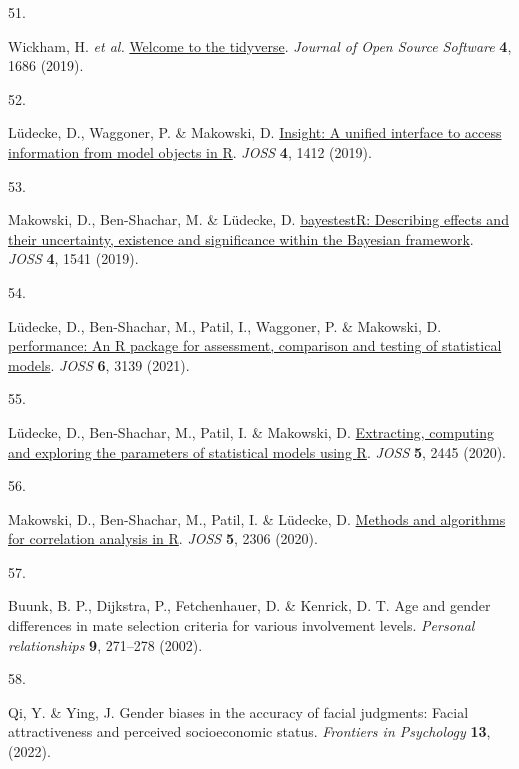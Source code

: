 \documentclass[
  man,floatsintext]{apa6}
\newlength{\cslhangindent}
\newlength{\csllabelwidth}
\newlength{\cslentryspacingunit} %
\newenvironment{CSLReferences}[2] %
 {%
  \setlength{\parindent}{0pt}
  \ifodd #1
  \let\oldpar\par
  \def\par{\hangindent=\cslhangindent\oldpar}
  \fi
  \setlength{\parskip}{#2\cslentryspacingunit}
 }%
 {}
\newcommand{\CSLLeftMargin}[1]{\parbox[t]{\csllabelwidth}{#1}}
\newcommand{\CSLRightInline}[1]{\parbox[t]{\linewidth - \csllabelwidth}{#1}\break}
\begin{document}
\begin{CSLReferences}{0}{0}
\leavevmode{}%
\CSLLeftMargin{51. }%
\CSLRightInline{Wickham, H. \emph{et al.} \href{https://doi.org/10.21105/joss.01686}{Welcome to the {tidyverse}}. \emph{Journal of Open Source Software} \textbf{4}, 1686 (2019).}

\leavevmode{}%
\CSLLeftMargin{52. }%
\CSLRightInline{Lüdecke, D., Waggoner, P. \& Makowski, D. \href{https://doi.org/10.21105/joss.01412}{Insight: A unified interface to access information from model objects in {R}}. \emph{JOSS} \textbf{4}, 1412 (2019).}

\leavevmode{}%
\CSLLeftMargin{53. }%
\CSLRightInline{Makowski, D., Ben-Shachar, M. \& Lüdecke, D. \href{https://doi.org/10.21105/joss.01541}{{bayestestR}: Describing effects and their uncertainty, existence and significance within the {Bayesian} framework}. \emph{JOSS} \textbf{4}, 1541 (2019).}

\leavevmode{}%
\CSLLeftMargin{54. }%
\CSLRightInline{Lüdecke, D., Ben-Shachar, M., Patil, I., Waggoner, P. \& Makowski, D. \href{https://doi.org/10.21105/joss.03139}{{performance}: An {R} package for assessment, comparison and testing of statistical models}. \emph{JOSS} \textbf{6}, 3139 (2021).}

\leavevmode{}%
\CSLLeftMargin{55. }%
\CSLRightInline{Lüdecke, D., Ben-Shachar, M., Patil, I. \& Makowski, D. \href{https://doi.org/10.21105/joss.02445}{Extracting, computing and exploring the parameters of statistical models using {R}}. \emph{JOSS} \textbf{5}, 2445 (2020).}

\leavevmode{}%
\CSLLeftMargin{56. }%
\CSLRightInline{Makowski, D., Ben-Shachar, M., Patil, I. \& Lüdecke, D. \href{https://doi.org/10.21105/joss.02306}{Methods and algorithms for correlation analysis in {R}}. \emph{JOSS} \textbf{5}, 2306 (2020).}

\leavevmode{}%
\CSLLeftMargin{57. }%
\CSLRightInline{Buunk, B. P., Dijkstra, P., Fetchenhauer, D. \& Kenrick, D. T. Age and gender differences in mate selection criteria for various involvement levels. \emph{Personal relationships} \textbf{9}, 271--278 (2002).}

\leavevmode{}%
\CSLLeftMargin{58. }%
\CSLRightInline{Qi, Y. \& Ying, J. Gender biases in the accuracy of facial judgments: Facial attractiveness and perceived socioeconomic status. \emph{Frontiers in Psychology} \textbf{13}, (2022).}


\end{CSLReferences}
\end{document}
